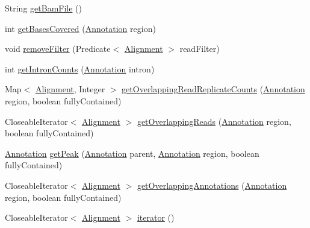 \begin{DoxyCompactItemize}
\item 
String \hyperlink{classumms_1_1core_1_1model_1_1_alignment_model_aa7aa575e64161143170f8840d920e438}{get\+Bam\+File} ()
\item 
int \hyperlink{classumms_1_1core_1_1model_1_1_alignment_model_abd322ee7a99c0ae2439baa28eeca23bc}{get\+Bases\+Covered} (\hyperlink{interfaceumms_1_1core_1_1annotation_1_1_annotation}{Annotation} region)
\item 
void \hyperlink{classumms_1_1core_1_1model_1_1_alignment_model_ab6b527bd29c0191df67def7958e2188a}{remove\+Filter} (Predicate$<$ \hyperlink{interfaceumms_1_1core_1_1alignment_1_1_alignment}{Alignment} $>$ read\+Filter)
\item 
int \hyperlink{classumms_1_1core_1_1model_1_1_alignment_model_a623a25e976697a1773196a2cf5f4d349}{get\+Intron\+Counts} (\hyperlink{interfaceumms_1_1core_1_1annotation_1_1_annotation}{Annotation} intron)
\item 
Map$<$ \hyperlink{interfaceumms_1_1core_1_1alignment_1_1_alignment}{Alignment}, Integer $>$ \hyperlink{classumms_1_1core_1_1model_1_1_alignment_model_a8db29afa1455774d98060c04f76b6c1c}{get\+Overlapping\+Read\+Replicate\+Counts} (\hyperlink{interfaceumms_1_1core_1_1annotation_1_1_annotation}{Annotation} region, boolean fully\+Contained)
\item 
Closeable\+Iterator$<$ \hyperlink{interfaceumms_1_1core_1_1alignment_1_1_alignment}{Alignment} $>$ \hyperlink{classumms_1_1core_1_1model_1_1_alignment_model_a70e18c970397ccd3b200529e5b9a6c15}{get\+Overlapping\+Reads} (\hyperlink{interfaceumms_1_1core_1_1annotation_1_1_annotation}{Annotation} region, boolean fully\+Contained)
\item 
\hyperlink{interfaceumms_1_1core_1_1annotation_1_1_annotation}{Annotation} \hyperlink{classumms_1_1core_1_1model_1_1_alignment_model_a1f85a13c310238f87b145bcc8bfe20b2}{get\+Peak} (\hyperlink{interfaceumms_1_1core_1_1annotation_1_1_annotation}{Annotation} parent, \hyperlink{interfaceumms_1_1core_1_1annotation_1_1_annotation}{Annotation} region, boolean fully\+Contained)
\item 
Closeable\+Iterator$<$ \hyperlink{interfaceumms_1_1core_1_1alignment_1_1_alignment}{Alignment} $>$ \hyperlink{classumms_1_1core_1_1model_1_1_alignment_model_af3b5cd3178779e5b2022e1739af7ef85}{get\+Overlapping\+Annotations} (\hyperlink{interfaceumms_1_1core_1_1annotation_1_1_annotation}{Annotation} region, boolean fully\+Contained)
\item 
Closeable\+Iterator$<$ \hyperlink{interfaceumms_1_1core_1_1alignment_1_1_alignment}{Alignment} $>$ \hyperlink{classumms_1_1core_1_1model_1_1_alignment_model_a605283647c0e4797f19a57b20fb870bc}{iterator} ()

\end{DoxyCompactItemize}
